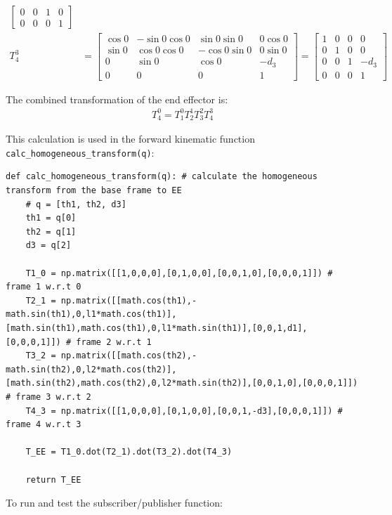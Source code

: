 \documentclass[10pt]{article}
\begin{document}
\begin{enumerate}
\begin{align*}
\begin{bmatrix}
		0 & 0 & 1 & 0 \\
		0 & 0 & 0 & 1
		\end{bmatrix}
		\\
		T_{4}^3 &= \begin{bmatrix}
		\cos 0 & -\sin 0 \cos 0 &\sin 0 \sin 0 & 0 \cos 0 \\
		\sin 0 & \cos 0 \cos 0 & -\cos 0 \sin 0 & 0 \sin 0 \\
		0 & \sin 0 & \cos 0 & -d_3 \\
		0 & 0 & 0 & 1
		\end{bmatrix} = \begin{bmatrix}
		1 & 0 & 0 & 0 \\
		0 & 1 & 0 & 0 \\
		0 & 0 & 1 & -d_3 \\
		0 & 0 & 0 & 1
		\end{bmatrix}
	\end{align*}
	
	The combined transformation of the end effector is:
	\begin{align*}
		T_4^0 = T_1^0 T_2^1 T_3^2 T_4^3
	\end{align*}
	
	This calculation is used in the forward kinematic function \texttt{calc\_homogeneous\_transform(q)}:
	
\begin{lstlisting}[style=Matlab-editor,basicstyle=\mlttfamily,escapechar=`]
def calc_homogeneous_transform(q): # calculate the homogeneous transform from the base frame to EE
	# q = [th1, th2, d3]
	th1 = q[0]
	th2 = q[1]
	d3 = q[2]
	
	T1_0 = np.matrix([[1,0,0,0],[0,1,0,0],[0,0,1,0],[0,0,0,1]]) # frame 1 w.r.t 0
	T2_1 = np.matrix([[math.cos(th1),-math.sin(th1),0,l1*math.cos(th1)],[math.sin(th1),math.cos(th1),0,l1*math.sin(th1)],[0,0,1,d1],[0,0,0,1]])	# frame 2 w.r.t 1 
	T3_2 = np.matrix([[math.cos(th2),-math.sin(th2),0,l2*math.cos(th2)],[math.sin(th2),math.cos(th2),0,l2*math.sin(th2)],[0,0,1,0],[0,0,0,1]])	# frame 3 w.r.t 2 
	T4_3 = np.matrix([[1,0,0,0],[0,1,0,0],[0,0,1,-d3],[0,0,0,1]]) # frame 4 w.r.t 3
	
	T_EE = T1_0.dot(T2_1).dot(T3_2).dot(T4_3)
	
	return T_EE
\end{lstlisting}
	

	To run and test the subscriber/publisher function:
	

\end{enumerate}
\end{document}
